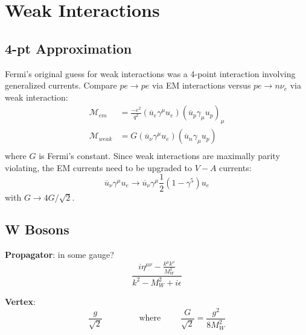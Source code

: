 \documentclass[12pt]{article}
\theoremstyle{definition}
\begin{document}
\section{Weak Interactions}

\subsection{4-pt Approximation}
Fermi's original guess for weak interactions was a 4-point interaction involving generalized currents.
Compare $pe \to pe$ via EM interactions versus $pe \to n \nu_e$ via weak interaction:
\begin{equation*}
\begin{split}
    \mathcal{M}_{em} &= \frac{-e^2}{q^2} \left( \overline{u}_e \gamma^\mu u_e \right) \left( \overline{u}_p \gamma_\mu u_p \right)_\mu \\
    \mathcal{M}_{weak} &= G \left( \overline{u}_\nu \gamma^\mu u_e \right) \left( \overline{u}_n \gamma_\mu u_p \right) \\
\end{split}
\end{equation*}
where $G$ is Fermi's constant. Since weak interactions are maximally parity violating, the EM currents
need to be upgraded to $V-A$ currents:
\begin{equation*}
    \overline{u}_\nu \gamma^\mu u_e \to \overline{u}_\nu \gamma^\mu \frac{1}{2} (1 - \gamma^5) u_e
\end{equation*}
with $G \to 4G/\sqrt{2}$.

\subsection{W Bosons}
\textbf{Propagator}: in some gauge?
\begin{equation*}
    \frac{i \eta^{\mu\nu} - \frac{k^\mu k^\nu}{M_W^2}}{k^2 - M_W^2 + i\epsilon}
\end{equation*}

\textbf{Vertex}:
\begin{equation*}
    \frac{g}{\sqrt{2}} \qquad \qquad \text{ where } \qquad \frac{G}{\sqrt{2} } = \frac{g^2}{8M_W^2}
\end{equation*}
\end{document}

